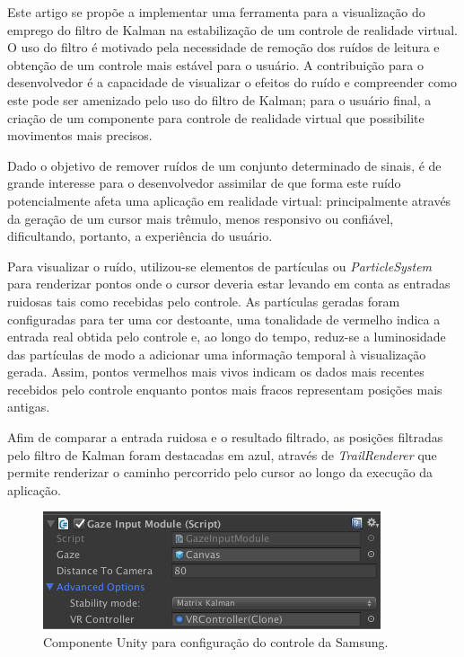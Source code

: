 \documentclass[conference]{IEEEtran}
\begin{document}
Este artigo se propõe a implementar uma ferramenta para a visualização do emprego do filtro de Kalman na estabilização de um controle de realidade virtual. O uso do filtro é motivado pela necessidade de remoção dos ruídos de leitura e obtenção de um controle mais estável para o usuário. A contribuição para o desenvolvedor é a capacidade de visualizar o efeitos do ruído e compreender como este pode ser amenizado pelo uso do filtro de Kalman; para o usuário final, a criação de um componente para controle de realidade virtual que possibilite movimentos mais precisos.


Dado o objetivo de remover ruídos de um conjunto determinado de sinais, é de grande interesse para o desenvolvedor assimilar de que forma este ruído potencialmente afeta uma aplicação em realidade virtual: principalmente através da geração de um cursor mais trêmulo, menos responsivo ou confiável, dificultando, portanto, a experiência do usuário.


Para visualizar o ruído, utilizou-se elementos de partículas ou \textit{ParticleSystem} para renderizar pontos onde o cursor deveria estar levando em conta as entradas ruidosas tais como recebidas pelo controle. As partículas geradas foram configuradas para ter uma cor destoante, uma tonalidade de vermelho indica a entrada real obtida pelo controle e, ao longo do tempo, reduz-se a luminosidade das partículas de modo a adicionar uma informação temporal à visualização gerada. Assim, pontos vermelhos mais vivos indicam os dados mais recentes recebidos pelo controle enquanto pontos mais fracos representam posições mais antigas.

Afim de comparar a entrada ruidosa e o resultado filtrado, as posições filtradas pelo filtro de Kalman foram destacadas em azul, através de \textit{TrailRenderer} que permite renderizar o caminho percorrido pelo cursor ao longo da execução da aplicação.

\begin{figure}[ht]
\centering
\includegraphics[width=.5\textwidth]{images/controller_input.png}
\caption{Componente Unity para configuração do controle da Samsung.}
\label{fig:controllercomponent}
\end{figure}
\end{document}
